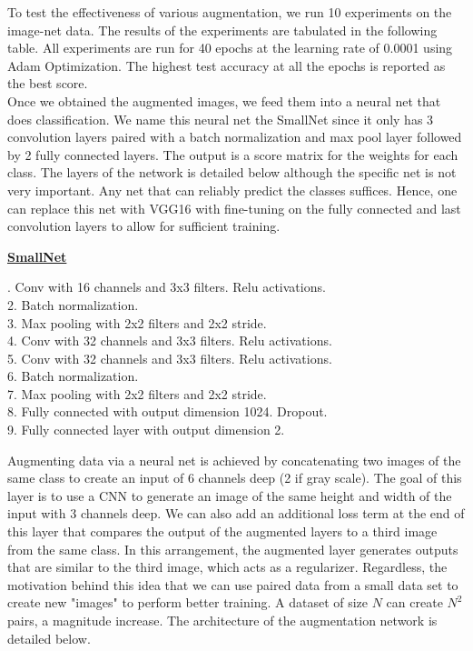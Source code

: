 \documentclass[10pt,twocolumn,letterpaper]{article}
\begin{document}
To test the effectiveness of various augmentation, we run 10 experiments on the image-net data. The results of the experiments are tabulated in the following table. All experiments are run for 40 epochs at the learning rate of 0.0001 using Adam Optimization. The highest test accuracy at all the epochs is reported as the best score. \\

Once we obtained the augmented images, we feed them into a neural net that does classification. We name this neural net the SmallNet since it only has 3 convolution layers paired with a batch normalization and max pool layer followed by 2 fully connected layers. The output is a score matrix for the weights for each class. The layers of the network is detailed below although the specific net is not very important. Any net that can reliably predict the classes suffices. Hence, one can replace this net with VGG16 with fine-tuning on the fully connected and last convolution layers to allow for sufficient training. \\

\begin{center}
\underline{\textbf{SmallNet}}

. Conv with 16 channels and 3x3 filters. Relu activations. \\
2. Batch normalization. \\
3. Max pooling with 2x2 filters and 2x2 stride. \\
4. Conv with 32 channels and 3x3 filters. Relu activations. \\
5. Conv with 32 channels and 3x3 filters. Relu activations. \\
6. Batch normalization. \\
7. Max pooling with 2x2 filters and 2x2 stride. \\
8. Fully connected with output dimension 1024. Dropout. \\
9. Fully connected layer with output dimension 2. \\
\end{center}

Augmenting data via a neural net is achieved by concatenating two images of the same class to create an input of 6 channels deep (2 if gray scale). The goal of this layer is to use a CNN to generate an image of the same height and width of the input with 3 channels deep. We can also add an additional loss term at the end of this layer that compares the output of the augmented layers to a third image from the same class. In this arrangement, the augmented layer generates outputs that are similar to the third image, which acts as a regularizer. Regardless, the motivation behind this idea that we can use paired data from a small data set to create new "images" to perform better training. A dataset of size $N$ can create $N^2$ pairs, a magnitude increase. The architecture of the augmentation network is detailed below. 
\end{document}
